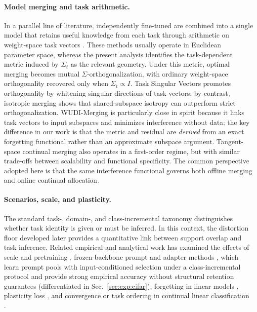 \documentclass[10pt,a4paper]{article}
\theoremstyle{plain}
\theoremstyle{definition}
\newcommand{\Sig}{\Sigma}
\begin{document}
\paragraph{Model merging and task arithmetic.} In a parallel line of literature,
independently fine-tuned are
combined into a single model that retains useful knowledge from each task
through arithmetic on weight-space task vectors
\cite{ilharco2023,yadav2023}. These methods usually operate in Euclidean parameter
space, whereas the present analysis identifies the task-dependent metric induced by
$\Sig_t$ as the relevant geometry. Under this metric, optimal merging becomes mutual
$\Sig$-orthogonalization, with ordinary weight-space orthogonality recovered only when
$\Sig_t\propto I$. Task Singular Vectors \cite{gargiulo2025tsv} promotes orthogonality
by whitening singular directions of task vectors; by contrast, isotropic merging
\cite{marczak2025iso} shows that shared-subspace isotropy can outperform strict
orthogonalization. WUDI-Merging \cite{cheng2025wudi} is particularly close in spirit
because it links task vectors to input subspaces and minimizes interference without
data; the key difference in our work is that the metric and residual are \emph{derived} from
an exact forgetting functional rather than an approximate subspace argument.
Tangent-space continual merging \cite{holistic2026} also operates in a first-order
regime, but with similar trade-offs between scalability and functional specificity.
The common perspective adopted here is that the same interference functional governs
both offline merging and online continual allocation.

\paragraph{Scenarios, scale, and plasticity.} The standard task-, domain-, and
class-incremental taxonomy \cite{vandeven2022} distinguishes whether task identity is
given or must be inferred. In this context, the distortion floor developed later
provides a quantitative link between support overlap and task inference. Related
empirical and analytical work has examined the effects of scale and pretraining
\cite{ramasesh2022}, frozen-backbone prompt and adapter methods
\cite{wang2022l2p,wang2022dualprompt,smith2023coda}, which learn prompt pools with
input-conditioned selection under a class-incremental protocol and provide strong empirical
accuracy without structural retention guarantees (differentiated in
Sec.~\ref{sec:exp:cifar}), forgetting in linear models
\cite{evron2022}, plasticity loss \cite{dohare2024}, and convergence or task ordering
in continual linear classification \cite{jung2025,lihiratani2025}.
\end{document}
